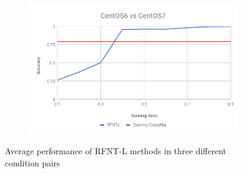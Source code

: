 \documentclass[10pt, conference, compsocconf]{IEEEtran}
\begin{document}
\begin{figure}[h!]
\begin{subfigure}[b]{0.8\linewidth}
                \includegraphics[width=\columnwidth]{figures/ALS/RFNT-L-ALS-6vs7-PFS}
        \end{subfigure}
        \caption{Average performance of RFNT-L methods in three different condition pairs}
        \label{fig:RFNT-L method}
\end{figure}
\end{document}
